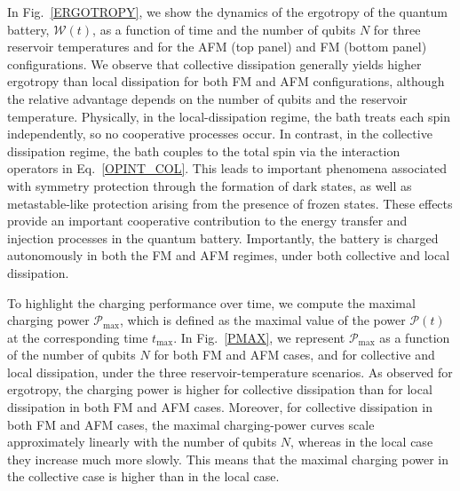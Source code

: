 \documentclass[aps,superscriptaddress,twocolumn,pre,longbibliography,floatfix]{revtex4-1}
\begin{document}
	In Fig.~\ref{ERGOTROPY}, we show the dynamics of the ergotropy of the quantum battery, $\mathcal{W}(t)$, as a function of time and the number of qubits $N$ for three reservoir temperatures and for the AFM (top panel) and FM (bottom panel) configurations. We observe that collective dissipation generally yields higher ergotropy than local dissipation for both FM and AFM configurations, although the relative advantage depends on the number of qubits and the reservoir temperature. Physically, in the local-dissipation regime, the bath treats each spin independently, so no cooperative processes occur. In contrast, in the collective dissipation regime, the bath couples to the total spin via the interaction operators in Eq.~\eqref{OPINT_COL}. This leads to important phenomena associated with symmetry protection through the formation of dark states, as well as metastable-like protection arising from the presence of frozen states. These effects provide an important cooperative contribution to the energy transfer and injection processes in the quantum battery. Importantly, the battery is charged autonomously in both the FM and AFM regimes, under both collective and local dissipation.
	
	To highlight the charging performance over time, we compute the maximal charging power $\mathcal{P}_{\max}$, which is defined as the maximal value of the power $\mathcal{P}(t)$ at the corresponding time $t_{\max}$. In Fig.~\ref{PMAX}, we represent $\mathcal{P}_{\max}$ as a function of the number of qubits $N$ for both FM and AFM cases, and for collective and local dissipation, under the three reservoir-temperature scenarios. As observed for ergotropy, the charging power is higher for collective dissipation than for local dissipation in both FM and AFM cases. Moreover, for collective dissipation in both FM and AFM cases, the maximal charging-power curves scale approximately linearly with the number of qubits $N$, whereas in the local case they increase much more slowly. This means that the maximal charging power in the collective case is higher than in the local case.
	
\end{document}
